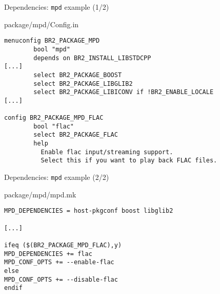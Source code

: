 \begin{frame}[fragile]{Dependencies: {\tt mpd} example (1/2)}

\begin{block}{package/mpd/Config.in}
{\scriptsize
\begin{verbatim}
menuconfig BR2_PACKAGE_MPD
        bool "mpd"
        depends on BR2_INSTALL_LIBSTDCPP
[...]
        select BR2_PACKAGE_BOOST
        select BR2_PACKAGE_LIBGLIB2
        select BR2_PACKAGE_LIBICONV if !BR2_ENABLE_LOCALE
[...]

config BR2_PACKAGE_MPD_FLAC
        bool "flac"
        select BR2_PACKAGE_FLAC
        help
          Enable flac input/streaming support.
          Select this if you want to play back FLAC files.

\end{verbatim}}
\end{block}

\end{frame}

\begin{frame}[fragile]{Dependencies: {\tt mpd} example (2/2)}

\begin{block}{package/mpd/mpd.mk}
\begin{verbatim}
MPD_DEPENDENCIES = host-pkgconf boost libglib2

[...]

ifeq ($(BR2_PACKAGE_MPD_FLAC),y)
MPD_DEPENDENCIES += flac
MPD_CONF_OPTS += --enable-flac
else
MPD_CONF_OPTS += --disable-flac
endif
\end{verbatim}
\end{block}

\end{frame}


